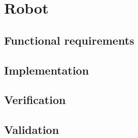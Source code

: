 \documentclass[../../main.tex]{subfiles}
\begin{document}
\section{Robot}%
\label{sec:robot}

\subsection{Functional requirements}%
\label{sec:function_requirements}


\subsection{Implementation}%
\label{sec:implementation}


\subsection{Verification}%
\label{sec:verification}


\subsection{Validation}%
\label{sec:validation}





	
\end{document}
